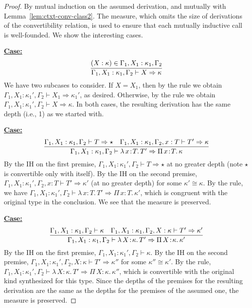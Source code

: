 \documentclass{article}
\newcommand{\abs}[4]{{#1}\, #2\! : \! #3.\, #4}
\newcommand{\tpsynth}[0]{\Rightarrow}
\newcommand{\startcase}[1]{\vspace{#1} \noindent\textbf{\underline{Case:}}}
\begin{document}
\begin{proof}
  By mutual induction on the assumed derivation, and mutually with
  Lemma~\ref{lem:ctxt-conv-class2}.
  The measure, which omits the size of derivations of the convertibility
  relation, is used to ensure that each mutually inductive call is well-founded.
  We show the interesting cases.

  \startcase{.2cm}
  \[
    \infer{\Gamma_1,X_1:\kappa_1,\Gamma_2 \vdash X \tpsynth \kappa}{(X : \kappa) \in \Gamma_1,X_1:\kappa_1,\Gamma_2}
  \]
  We have two subcases to consider.
  If \(X = X_1\), then by the rule we obtain \(\Gamma_1,X_1:\kappa_1',\Gamma_2
  \vdash X_1 \tpsynth \kappa_1'\), as desired.
  Otherwise, by the rule we obtain \(\Gamma_1,X_1:\kappa_1',\Gamma_2
  \vdash X \tpsynth \kappa\).
  In both cases, the resulting derivation has the same depth (i.e., 1) as we
  started with.

  \startcase{.2cm}
  \[
    \infer{
      \Gamma_1,X_1:\kappa_1,\Gamma_2 \vdash\abs{\lambda}{x}{T}{T'} \tpsynth
      \abs{\Pi}{x}{T}{\kappa}
    }{
      \Gamma_1,X_1:\kappa_1,\Gamma_2 \vdash T \tpsynth \star
      & \Gamma_1,X_1:\kappa_1,\Gamma_2 ,x:T\vdash T'\tpsynth\kappa
    }
  \]
  By the IH on the first premise, \(\Gamma_1,X_1:\kappa_1',\Gamma_2 \vdash T
  \tpsynth \star\) at no greater depth (note \(\star\) is convertible only with
  itself).
  By the IH on the second premise, \(\Gamma_1,X_1:\kappa_1',\Gamma_2,x:T \vdash
  T' \tpsynth \kappa'\) (at no greater depth) for some \(\kappa' \cong \kappa\).
  By the rule, we have \(\Gamma_1,X_1:\kappa_1',\Gamma_2 \vdash
  \abs{\lambda}{x}{T}{T'} \tpsynth \abs{\Pi}{x}{T}{\kappa'}\), which is
  congruent with the original type in the conclusion.
  We see that the measure is preserved.
  
  
  \startcase{.2cm}
  \[
    \infer{
      \Gamma_1,X_1:\kappa_1,\Gamma_2 \vdash \abs{\lambda}{X}{\kappa}{T'} \tpsynth
      \abs{\Pi}{X}{\kappa}{\kappa'}
    }{
      \Gamma_1,X_1:\kappa_1,\Gamma_2 \vdash \kappa
      & \Gamma_1,X_1:\kappa_1,\Gamma_2,X:\kappa \vdash  T' \tpsynth \kappa'
    }
  \]
  By the IH on the first premise, \(\Gamma_1,X_1:\kappa_1',\Gamma_2 \vdash
  \kappa\).
  By the IH on the second premise, \(\Gamma_1,X_1:\kappa_1',\Gamma_2,X:\kappa
  \vdash T' \tpsynth \kappa''\) for some \(\kappa'' \cong \kappa'\).
  By the rule, \(\Gamma_1,X_1:\kappa_1',\Gamma_2 \vdash
  \abs{\lambda}{X}{\kappa}{T'} \tpsynth \abs{\Pi}{X}{\kappa}{\kappa''}\), which
  is convertible with the original kind synthesized for this type.
  Since the depths of the premises for the resulting derivation are the same as
  the depths for the premises of the assumed one, the measure is preserved.


\end{proof}
\end{document}
